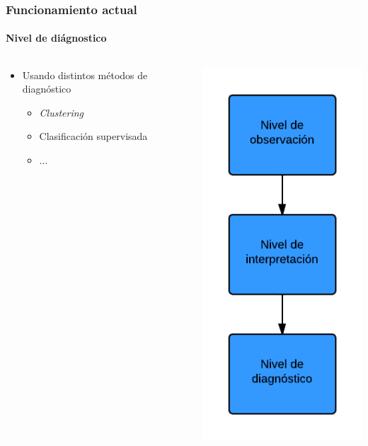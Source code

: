 \begin{frame}
	\frametitle{Funcionamiento actual}
	\framesubtitle{Nivel de di\'agnostico}
	
	\begin{columns}[T] %
		\begin{column}[T]{5cm} %
			\begin{itemize}
				\item Usando distintos m\'etodos de diagn\'ostico
				\begin{itemize}
					\item \textit{Clustering}
					\item Clasificaci\'on supervisada
					\item ...
				\end{itemize}
			\end{itemize}
		\end{column}
		\begin{column}[T]{5cm} %
			\includegraphics[width=0.5\linewidth]{./Figures/NivelDeDiagnostico.png}
		\end{column}
	\end{columns}
\end{frame}